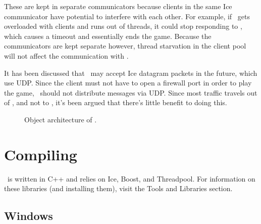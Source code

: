 These are kept in separate communicators because clients in the same Ice communicator have potential to interfere with each other. For example, if \GameServer\ gets overloaded with clients and runs out of threads, it could stop responding to \MainServer, which causes a timeout and essentially ends the game. Because the communicators are kept separate however, thread starvation in the client pool will not affect the communication with \MainServer.

It has been discussed that \GameServer\ may accept Ice datagram packets in the future, which use UDP. Since the client must not have to open a firewall port in order to play the game, \GameServer\ should not distribute messages via UDP. Since most traffic travels out of \GameServer, and not to \GameServer, it's been argued that there's little benefit to doing this.

\newpage
\begin{figure}
	\centering
	\caption{Object architecture of \GameServer.}
	\label{fig:theatre_architecture}
\end{figure}

\section{Compiling}

\GameServer\ is written in C++ and relies on Ice, Boost, and Threadpool. For information on these libraries (and installing them), visit the Tools and Libraries section.

\subsection{Windows}

